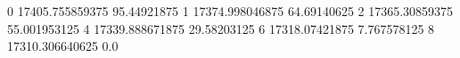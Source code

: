0 17405.755859375 95.44921875
1 17374.998046875 64.69140625
2 17365.30859375 55.001953125
4 17339.888671875 29.58203125
6 17318.07421875 7.767578125
8 17310.306640625 0.0
